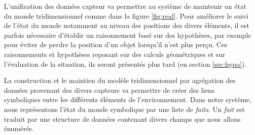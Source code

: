 \documentclass[a4paper,11pt,twoside]{StyleThese}
\begin{document}
L'unification des données capteur va permettre au système de maintenir un état du monde tridimensionnel comme dans la figure \ref{fig:real}. Pour améliorer le suivi de l'état du monde notamment au niveau des positions des divers éléments, il est parfois nécessaire d'établir un raisonnement basé sur des hypothèses, par exemple pour éviter de perdre la position d'un objet lorsqu'il n'est plus perçu. Ces raisonnements et hypothèses reposant sur des calculs géométriques et sur l'évaluation de la situation, ils seront présentés plus tard (en section \ref{sec:hypo}). 

La construction et le maintien du modèle tridimensionnel par agrégation des données provenant des divers capteurs va permettre de créer des liens symboliques entre les différents éléments de l'environnement. Dans notre système, nous représentons l'état du monde symbolique par une liste de \textit{faits}. Un \textit{fait} est traduit par une structure de données contenant divers champs que nous allons énumérés.
\end{document}
